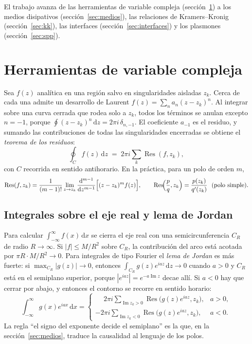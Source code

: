 \documentclass[11pt,letterpaper]{article}
\newcommand{\dd}{\mathrm{d}}
\DeclareMathOperator{\Res}{Res}
\renewcommand{\Im}{\operatorname{Im}}
\begin{document}
El trabajo avanza de las herramientas de variable compleja
(sección~\ref{sec:vc}) a los medios disipativos (sección~\ref{sec:medios}), las
relaciones de Kramers--Kronig (sección~\ref{sec:kk}), las interfaces
(sección~\ref{sec:interfaces}) y los plasmones (sección~\ref{sec:spp}).

\section{Herramientas de variable compleja}\label{sec:vc}

Sea $f(z)$ analítica en una región salvo en singularidades aisladas $z_k$.
Cerca de cada una admite un desarrollo de Laurent
$f(z)=\sum_n a_n(z-z_k)^n$. Al integrar sobre una curva cerrada que rodea solo
a $z_k$, todos los términos se anulan excepto $n=-1$, porque
$\oint(z-z_k)^n\,\dd z=2\pi i\,\delta_{n,-1}$. El coeficiente $a_{-1}$ es el
residuo, y sumando las contribuciones de todas las singularidades encerradas se
obtiene el \emph{teorema de los residuos}:
\begin{equation}\label{eq:residuos}
  \oint_C f(z)\,\dd z \;=\; 2\pi i\sum_k \Res(f,z_k),
\end{equation}
con $C$ recorrida en sentido antihorario. En la práctica, para un polo de
orden $m$,
\begin{equation}\label{eq:calcres}
  \Res(f,z_k)=\frac{1}{(m-1)!}\lim_{z\to z_k}\frac{\dd^{m-1}}{\dd z^{m-1}}
  \Bigl[(z-z_k)^m f(z)\Bigr],\qquad
  \Res\!\Bigl(\frac{p}{q},z_k\Bigr)=\frac{p(z_k)}{q'(z_k)}\ \ \text{(polo simple)}.
\end{equation}

\subsection{Integrales sobre el eje real y lema de Jordan}

Para calcular $\int_{-\infty}^{\infty}f(x)\,\dd x$ se cierra el eje real con
una semicircunferencia $C_R$ de radio $R\to\infty$. Si $|f|\le M/R^2$ sobre
$C_R$, la contribución del arco está acotada por $\pi R\cdot M/R^2\to0$. Para
integrales de tipo Fourier el \emph{lema de Jordan} es más fuerte: si
$\max_{C_R}|g(z)|\to0$, entonces $\int_{C_R}g(z)e^{iaz}\,\dd z\to0$ cuando
$a>0$ y $C_R$ está en el semiplano superior, porque
$|e^{iaz}|=e^{-a\Im z}$ decae allí. Si $a<0$ hay que cerrar por abajo, y
entonces el contorno se recorre en sentido horario:
\begin{equation}\label{eq:jordan}
  \int_{-\infty}^{\infty}g(x)e^{iax}\,\dd x=
  \begin{cases}
    \displaystyle\phantom{-}2\pi i\sum_{\Im z_k>0}\Res\bigl(g(z)e^{iaz},z_k\bigr), & a>0,\\[3ex]
    \displaystyle-2\pi i\sum_{\Im z_k<0}\Res\bigl(g(z)e^{iaz},z_k\bigr), & a<0.
  \end{cases}
\end{equation}
La regla ``el signo del exponente decide el semiplano'' es la que, en la
sección~\ref{sec:medios}, traduce la causalidad al lenguaje de los polos.
\end{document}
